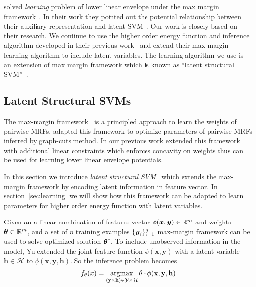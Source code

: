  solved \emph{learning} problem of lower
linear envelope under the max margin
framework~\cite{tsochantaridis2005large}. In their work they
pointed out the potential relationship between their auxiliary
representation and latent SVM~\cite{yu2009learning}. Our work is
closely based on their research. We continue to use the higher
order energy function and inference algorithm developed in their
previous work~\cite{Gould:ICML2011} and extend their max margin
learning algorithm to include latent variables. The learning
algorithm we use is an extension of max margin framework which is
known as ``latent structural SVM''~\cite{yu2009learning}.

\subsection{Latent Structural SVMs}
\label{sec:latent-struct-svms}

The max-margin
framework~\cite{Taskar:ICML05,tsochantaridis2005large} is a
principled approach to learn the weights of pairwise MRFs.
 adapted this framework to optimize
parameters of pairwise MRFs inferred by graph-cuts method. In our
previous work  extended this framework
with additional linear constraints which enforces concavity on
weights thus can be used for learning lower linear envelope
potentials.

In this section we introduce \emph{latent structural
  SVM}~\cite{yu2009learning} which extends the max-margin
framework by encoding latent information in feature vector. In
section~\ref{sec:learning} we will show how this framework can be
adapted to learn parameters for higher order energy function with
latent variables.

Given an a linear combination of features vector $\phi({\boldsymbol{x}} ,{\boldsymbol{y}})
\in \mathbb{R}^m$ and weights $\boldsymbol{\theta} \in \mathbb{R}^m$, and a set of
$n$ training examples $\{{\boldsymbol{y}}_i\}_{i=1}^n$ max-margin framework
can be used to solve optimized solution $\boldsymbol{\theta}^*$. To include
unobserved information in the model, Yu\cite{yu2009learning}
extended the joint feature function\cite{tsochantaridis2005large}
$\phi(\mathbf{x},\mathbf{y}) $ with a latent variable
$\mathbf{h}\in \mathcal{H}$ to
$\phi(\mathbf{x},\mathbf{y},\mathbf{h}) $. So the inference
problem becomes
\begin{align}
  \label{eq:latent_ssvm_linearcomb}
  f_\theta(x) = \mathop{\textrm{argmax}}_{(\mathbf{y} \times \mathbf{h}) \in \mathcal{Y}
  \times \mathcal{H}} \theta\cdot\phi(\mathbf{x},\mathbf{y},\mathbf{h})
\end{align}

